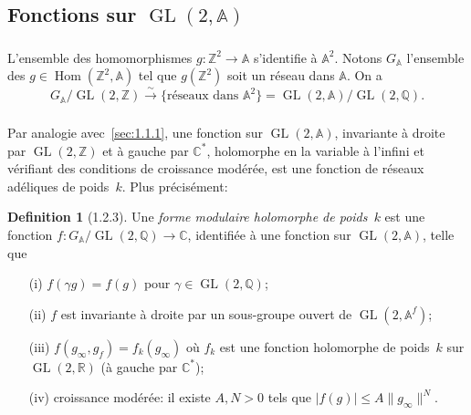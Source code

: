 \documentclass[11pt,a4paper]{amsart}
\theoremstyle{plain}
\theoremstyle{definition}
\newtheorem{definition}[theorem]{Definition}
\theoremstyle{remark}
\DeclareMathOperator{\Hom}{Hom}
\DeclareMathOperator{\GL}{GL}
\newcommand{\ZZ}{\mathbb{Z}}
\newcommand{\QQ}{\mathbb{Q}}
\newcommand{\RR}{\mathbb{R}}
\newcommand{\CC}{\mathbb{C}}
\newcommand{\Af}{\mathbb{A}}
\begin{document}
\subsection{Fonctions sur $\GL(2,\Af)$}

\subsubsection{}
\label{sec:1.2.1}

L'ensemble des homomorphismes $g: \ZZ^2 \to \Af$ s'identifie \`a $\Af^2$. Notons $G_\Af$ l'ensemble des $g \in \Hom(\ZZ^2, \Af)$ tel que $g(\ZZ^2)$ soit un r\'eseau dans $\Af$. On a
\[ G_\Af/\GL(2,\ZZ) \xrightarrow{\sim} \{\text{r\'eseaux dans } \Af^2\} = \GL(2,\Af)/\GL(2,\QQ). \]

\subsubsection{}
\label{sec:1.2.2}

Par analogie avec~\ref{sec:1.1.1}, une fonction sur $\GL(2,\Af)$, invariante \`a droite par $\GL(2,\ZZ)$ et \`a gauche par $\CC^*$, holomorphe en la variable \`a l'infini et v\'erifiant des conditions de croissance mod\'er\'ee, est une fonction de r\'eseaux ad\'eliques de poids~$k$. Plus pr\'ecis\'ement:

\begin{definition}[1.2.3] \label{def:1.2.3}
Une \emph{forme modulaire holomorphe de poids~$k$} est une fonction $f: G_\Af/\GL(2,\QQ) \to \CC$, identifi\'ee \`a une fonction sur $\GL(2,\Af)$, telle que
\begin{enumerate}
\item[(i)] $f(\gamma g) = f(g)$ pour $\gamma \in \GL(2,\QQ)$;
\item[(ii)] $f$ est invariante \`a droite par un sous-groupe ouvert de $\GL(2,\Af^f)$;
\item[(iii)] $f(g_\infty, g_f) = f_k(g_\infty)$ o\`u $f_k$ est une fonction holomorphe de poids~$k$ sur $\GL(2,\RR)$ (\`a gauche par $\CC^*$);
\item[(iv)] croissance mod\'er\'ee: il existe $A, N > 0$ tels que $|f(g)| \leq A \|g_\infty\|^N$.
\end{enumerate}
\end{definition}

\subsubsection{}
\label{sec:1.2.4}
\end{document}
